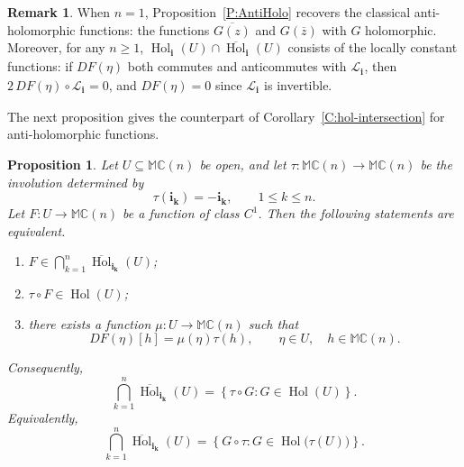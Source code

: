 \documentclass[12pt]{amsart}
\theoremstyle{plain}
\newtheorem{proposition}[theorem]{Proposition}
\theoremstyle{definition}
\newtheorem*{remark}{Remark}
\numberwithin{equation}{section}
\newcommand{\im}[1]{\mathbf{ i_{#1}}}
\newcommand{\mC}{\mathbb{C}}
\newcommand{\mM}{\mathbb{M}}
\newcommand{\cL}{\mathcal{L}}
\DeclareMathOperator{\hol}{Hol}
\begin{document}
    \begin{remark}
    When $n=1$, Proposition~\ref{P:AntiHolo} recovers the classical anti-holomorphic functions: the functions $\overline{G(z)}$ and $G(\overline{z})$ with $G$ holomorphic. Moreover, for any $n \geq 1$, $\hol_{\im{}} (U) \cap \overline{\hol}_{\im{}} (U)$ consists of the locally constant functions: if $DF (\eta )$ both commutes and anticommutes with $\cL_{\im{}}$, then $2\, DF (\eta ) \circ \cL_{\im{}} = 0$, and $DF (\eta ) = 0$ since $\cL_{\im{}}$ is invertible.
    \end{remark}

The next proposition gives the counterpart of Corollary~\ref{C:hol-intersection} for anti-holomorphic functions.
\begin{proposition}\label{P:AntiIntersection}
Let $U\subseteq\mM \mC(n)$ be open, and let
$\tau : \mM \mC(n) \to \mM \mC(n)$ be the involution determined by
\[
\tau(\im{k})=-\im{k},
\qquad 1\leq k\leq n.
\]
Let $F:U\to\mM \mC(n)$ be a function of class $C^1$. Then the following
statements are equivalent.
\begin{enumerate}
    \item[\textnormal{(i)}]
    $F\in\displaystyle\bigcap_{k=1}^{n}
    \overline{\hol}_{\im{k}}(U)$;

    \item[\textnormal{(ii)}]
    $\tau\circ F\in\hol(U)$;

    \item[\textnormal{(iii)}]
    there exists a function $\mu:U\to\mM \mC(n)$ such that
    \[
    DF(\eta)[h]=\mu(\eta)\tau(h),
    \qquad
    \eta\in U,\quad h\in\mM \mC(n).
    \]
\end{enumerate}
Consequently,
\[
\bigcap_{k=1}^{n}\overline{\hol}_{\im{k}}(U)
=
\left\{
\tau\circ G : G\in\hol(U)
\right\}.
\]
Equivalently,
\[
\bigcap_{k=1}^{n}\overline{\hol}_{\im{k}}(U)
=
\left\{
G\circ\tau :
G\in\hol\bigl(\tau(U)\bigr)
\right\}.
\]
\end{proposition}
\end{document}

